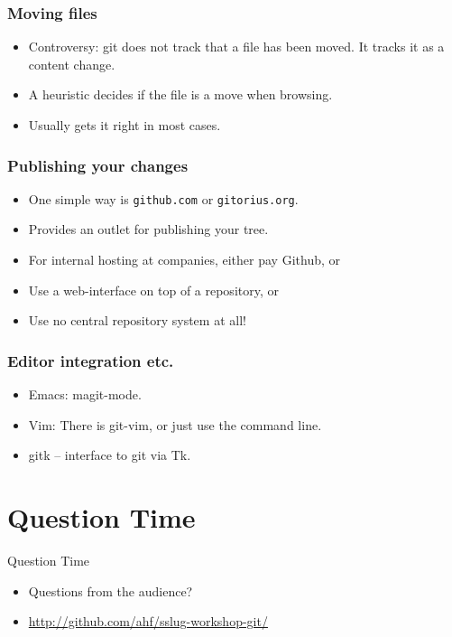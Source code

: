 \documentclass[xcolor=pdftex,dvipsnames]{beamer}
\begin{document}
\begin{frame}
  \frametitle{Moving files}
  \begin{itemize}
  \item Controversy: git does not track that a file has been moved. It
    tracks it as a content change.
  \item A heuristic decides if the file is a move when browsing.
  \item Usually gets it right in most cases.
  \end{itemize}
\end{frame}

\begin{frame}
  \frametitle{Publishing your changes}
  \begin{itemize}
  \item One simple way is \texttt{github.com} or \texttt{gitorius.org}.
  \item Provides an outlet for publishing your tree.
  \item For internal hosting at companies, either pay Github, or
  \item Use a web-interface on top of a repository, or
  \item Use no central repository system at all!
  \end{itemize}
\end{frame}

\begin{frame}
  \frametitle{Editor integration etc.}
  \begin{itemize}
  \item Emacs: magit-mode.
  \item Vim: There is git-vim, or just use the command line.
  \item gitk -- interface to git via Tk.
  \end{itemize}
\end{frame}


\section{Question Time}
\begin{frame}{Question Time}
    \begin{itemize}
        \item Questions from the audience?
        \item \url{http://github.com/ahf/sslug-workshop-git/}
    \end{itemize}
\end{frame}
\end{document}
